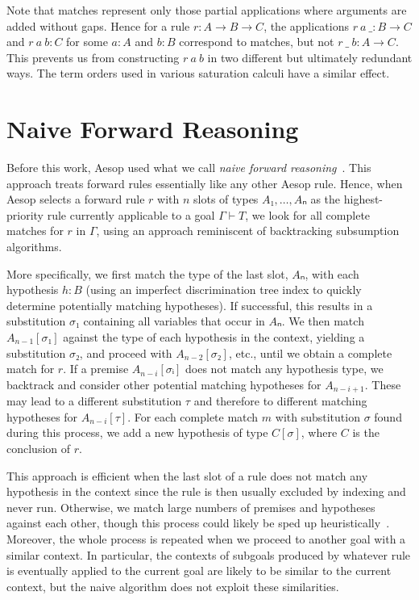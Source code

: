 \documentclass[runningheads,leqno]{llncs}
\begin{document}
Note that matches represent only those partial applications where arguments are added without gaps.
Hence for a rule $r : A → B → C$, the applications $r~a~\_ : B \to C$ and $r~a~b : C$ for some $a : A$ and $b : B$ correspond to matches, but not $r~\_~b : A \to C$.
This prevents us from constructing $r~a~b$ in two different but ultimately redundant ways.
The term orders used in various saturation calculi have a similar effect.

\section{Naive Forward Reasoning}%
\label{sec:naive}

Before this work, Aesop used what we call \emph{naive forward reasoning}~\cite{Aesop}.
This approach treats forward rules essentially like any other Aesop rule.
Hence, when Aesop selects a forward rule $r$ with $n$ slots of types $A₁, \dots, Aₙ$ as the highest-priority rule currently applicable to a goal $Γ ⊢ T$, we look for all complete matches for $r$ in $Γ$, using an approach reminiscent of backtracking subsumption algorithms.

More specifically, we first match the type of the last slot, $Aₙ$, with each hypothesis $h : B$ (using an imperfect discrimination tree index to quickly determine potentially matching hypotheses).
If successful, this results in a substitution $σ₁$ containing all variables that occur in $Aₙ$.
We then match $A_{n-1}[σ₁]$ against the type of each hypothesis in the context, yielding a substitution $σ₂$, and proceed with $A_{n-2}[σ₂]$, etc., until we obtain a complete match for $r$.
If a premise $A_{n-i}[σᵢ]$ does not match any hypothesis type, we backtrack and consider other potential matching hypotheses for $A_{n-i+1}$.
These may lead to a different substitution $τ$ and therefore to different matching hypotheses for $A_{n-i}[τ]$.
For each complete match $m$ with substitution $σ$ found during this process, we add a new hypothesis of type $C[σ]$, where $C$ is the conclusion of $r$.

This approach is efficient when the last slot of a rule does not match any hypothesis in the context since the rule is then usually excluded by indexing and never run.
Otherwise, we match large numbers of premises and hypotheses against each other, though this process could likely be sped up heuristically~\cite{TammetSubsumption}.
Moreover, the whole process is repeated when we proceed to another goal with a similar context.
In particular, the contexts of subgoals produced by whatever rule is eventually applied to the current goal are likely to be similar to the current context, but the naive algorithm does not exploit these similarities.
\end{document}
